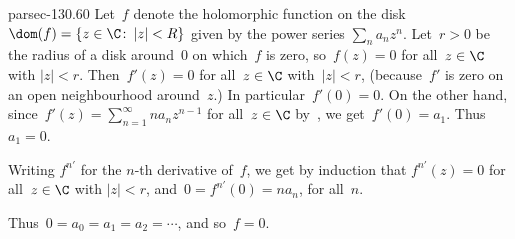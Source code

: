 \documentclass[b5page]{book}
\begin{document}
\begin{solution}{parsec-130.60}
Let~$f$ denote the holomorphic
    function on the disk $\dom(f)=\{z\in \C\colon \left|z\right|<R\}$
    given by the power series $\sum_n a_n z^n$.
Let~$r>0$ be the radius of a disk around~$0$ on  which~$f$ is zero,
    so~$f(z)=0$ for all~$z\in \C$ with $\left|z\right|<r$.
Then~$f'(z)=0$ for all~$z\in \C$ with~$\left|z\right|<r$,
    (because~$f'$ is zero on an open neighbourhood around~$z$.)
In particular~$f'(0)=0$.
On the other hand,
    since~$f'(z)=\sum_{n=1}^\infty
    n a_{n} z^{n-1}$ for all~$z\in \C$
by~,
    we get~$f'(0)=a_1$.
    Thus~$a_1=0$.

Writing $f^{n\prime }$ for the $n$-th derivative of~$f$,
we get by induction 
that $f^{n \prime }(z)=0$ for all~$z\in \C$
    with $\left|z\right|< r$,
    and~$0=f^{n\prime }(0)=na_n$, for all~$n$.

    Thus~$0=a_0=a_1=a_2=\dotsb$,
    and so~$f=0$.
\end{solution}
\end{document}
